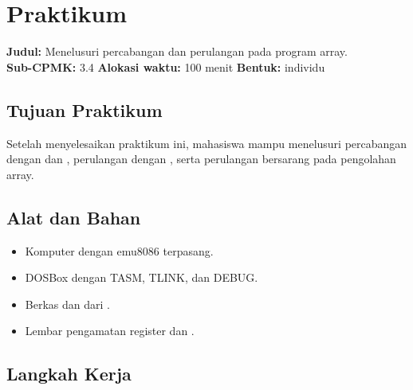 \section{Praktikum}
\label{sec:praktikum-bab13}

\begin{praktikumbox}
\vspace{1.1em}
\textbf{Judul:} Menelusuri percabangan dan perulangan pada program
array.\\[0.3em]
\textbf{Sub-CPMK:} 3.4 \quad\textbullet\quad
\textbf{Alokasi waktu:} 100 menit \quad\textbullet\quad
\textbf{Bentuk:} individu
\end{praktikumbox}

\subsection{Tujuan Praktikum}

Setelah menyelesaikan praktikum ini, mahasiswa mampu menelusuri
percabangan dengan  dan , perulangan dengan
, serta perulangan bersarang pada pengolahan array.

\subsection{Alat dan Bahan}

\begin{itemize}
    \item Komputer dengan emu8086 terpasang.
    \item DOSBox dengan TASM, TLINK, dan DEBUG.
    \item Berkas  dan
           dari .
    \item Lembar pengamatan register dan .
\end{itemize}

\subsection{Langkah Kerja}

